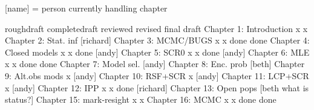 [name] = person currently handling chapter


                          roughdraft   completedraft  reviewed  revised  final draft
Chapter 1: Introduction       x              x
Chapter 2: Stat. inf        [richard]
Chapter 3: MCMC/BUGS          x              x         done      done
Chapter 4: Closed models      x              x         done     [andy]
Chapter 5: SCR0               x              x         done     [andy]
Chapter 6: MLE                x              x         done      done
Chapter 7: Model sel.       [andy]
Chapter 8: Enc. prob        [beth]
Chapter 9: Alt.obs mods       x           [andy]
Chapter 10: RSF+SCR           x           [andy]
Chapter 11: LCP+SCR           x           [andy]
Chapter 12: IPP               x              x         done     [richard]
Chapter 13: Open pops       [beth what is status?]
Chapter 15: mark-resight      x              x        
Chapter 16: MCMC              x              x         done      done


